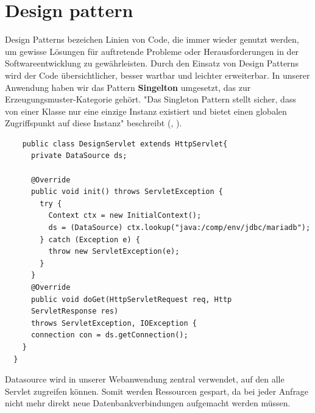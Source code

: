\section{Design pattern}
Design Patterns bezeichen Linien von Code, die immer wieder genutzt werden, um gewisse Lösungen für auftretende Probleme oder Herausforderungen in der Softwareentwicklung zu gewährleisten. Durch den Einsatz von Design Patterns wird der Code übersichtlicher, besser wartbar und leichter erweiterbar.
  In unserer Anwendung haben wir das Pattern \textbf{Singelton} umgesetzt, das zur Erzeugungsmuster-Kategorie gehört.\autocite{pattern2026}
  "Das Singleton Pattern stellt sicher, dass von einer Klasse nur eine einzige Instanz existiert und bietet einen globalen Zugriffspunkt auf diese Instanz"\; beschreibt (\citeauthor{pattern2026}, \citeyear{pattern2026}).   
  \begin{verbatim}
    public class DesignServlet extends HttpServlet{
      private DataSource ds;

      @Override
      public void init() throws ServletException {
        try {
          Context ctx = new InitialContext();
          ds = (DataSource) ctx.lookup("java:/comp/env/jdbc/mariadb");
        } catch (Exception e) {
          throw new ServletException(e);
        }
      }
      @Override
      public void doGet(HttpServletRequest req, Http
      ServletResponse res)
      throws ServletException, IOException {
      connection con = ds.getConnection();
    }
  }
  \end{verbatim}
Datasource wird in unserer Webanwendung zentral verwendet, auf den alle Servlet zugreifen können. Somit werden Ressourcen gespart, da bei jeder Anfrage nicht mehr direkt neue Datenbankverbindungen aufgemacht werden müssen.

